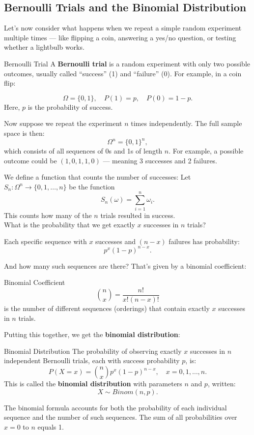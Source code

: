 \subsection{Bernoulli Trials and the Binomial Distribution}

Let’s now consider what happens when we repeat a simple random experiment multiple times — like flipping a coin, answering a yes/no question, or testing whether a lightbulb works.\\

\begin{df}{Bernoulli Trial}
A \textbf{Bernoulli trial} is a random experiment with only two possible outcomes, usually called “success” (1) and “failure” (0). For example, in a coin flip:

\[
\Omega = \{0, 1\}, \quad P(1) = p, \quad P(0) = 1 - p.
\]
Here, $p$ is the probability of success.
\end{df}

Now suppose we repeat the experiment $n$ times independently. The full sample space is then:
\[
\Omega^n = \{0, 1\}^n,
\]
which consists of all sequences of 0s and 1s of length $n$. For example, a possible outcome could be $(1, 0, 1, 1, 0)$ — meaning 3 successes and 2 failures.

We define a function that counts the number of successes: Let $S_n: \Omega^n \to \{0, 1, \dots, n\}$ be the function
\[
S_n(\omega) = \sum_{i=1}^n \omega_i.
\]
This counts how many of the $n$ trials resulted in success.\\


What is the probability that we get exactly $x$ successes in $n$ trials?

Each specific sequence with $x$ successes and $(n - x)$ failures has probability:
\[
p^x (1 - p)^{n - x}.
\]

And how many such sequences are there? That’s given by a binomial coefficient:

\begin{df}{Binomial Coefficient}
\[
\binom{n}{x} = \frac{n!}{x!(n - x)!}
\]
is the number of different sequences (orderings) that contain exactly $x$ successes in $n$ trials.
\end{df}

Putting this together, we get the \textbf{binomial distribution}:

\begin{df}{Binomial Distribution}
The probability of observing exactly $x$ successes in $n$ independent Bernoulli trials, each with success probability $p$, is:
\[
P(X = x) = \binom{n}{x} p^x (1 - p)^{n - x}, \quad x = 0, 1, \dots, n.
\]
This is called the \textbf{binomial distribution} with parameters $n$ and $p$, written:
\[
X \sim Binom(n, p).
\]
\end{df}

\begin{rmk}
The binomial formula accounts for both the probability of each individual sequence and the number of such sequences. The sum of all probabilities over $x = 0$ to $n$ equals 1.
\end{rmk}



